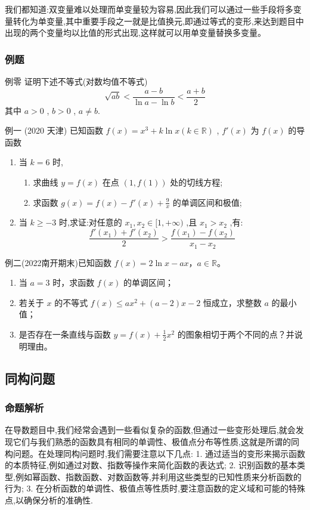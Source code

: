 \documentclass{article}
\begin{document}
我们都知道:双变量难以处理而单变量较为容易,因此我们可以通过一些手段将多变量转化为单变量,其中重要手段之一就是比值换元,即通过等式的变形,来达到题目中出现的两个变量均以比值的形式出现,这样就可以用单变量替换多变量。

\subsubsection{例题}

例零\; 证明下述不等式(对数均值不等式)
\[
\sqrt{a b}<\frac{a-b}{\ln a-\ln b}<\frac{a+b}{2}
\]
其中 $a>0$ , $b>0$ , $a \neq b$.
\vspace{10\baselineskip}


例一 (2020 天津) 已知函数 $f(x)=x^3+k \ln x(k \in \mathbb{R})$ , $f'(x)$ 为 $f(x)$ 的导函数
\begin{enumerate}
\item[(I)] 当 $k=6$ 时,
\begin{enumerate}
\item[(i)] 求曲线 $y=f(x)$ 在点 $(1, f(1))$ 处的切线方程;
\item[(ii)] 求函数 $g(x)=f(x)-f'(x)+\frac{9}{x}$ 的单调区间和极值;
\end{enumerate}
\item[(II)] 当 $k \geq-3$ 时,求证:对任意的 $x_1,x_2 \in[1,+\infty)$ ,且 $x_1>x_2$ ,有:
\[
\frac{f'\left(x_1\right)+f'\left(x_2\right)}{2}>\frac{f\left(x_1\right)-f\left(x_2\right)}{x_1-x_2}
\]
\end{enumerate}
\vspace{22\baselineskip}

例二(2022南开期末)已知函数 \(f(x) = 2\ln x - ax\)，\(a \in \mathbb{R}\)。

\begin{enumerate}
    \item[(1)] 当 \(a = 3\) 时，求函数 \(f(x)\) 的单调区间；
    \item[(2)] 若关于 \(x\) 的不等式 \(f(x) \leq ax^2 + (a-2)x - 2\) 恒成立，求整数 \(a\) 的最小值；
    \item[(3)] 是否存在一条直线与函数 \(y = f(x) + \frac{1}{2}x^2\) 的图象相切于两个不同的点？并说明理由。
\end{enumerate}
\vspace{25\baselineskip}
\newpage 

\subsection{同构问题}
\subsubsection{命题解析}
在导数题目中,我们经常会遇到一些看似复杂的函数,但通过一些变形处理后,就会发现它们与我们熟悉的函数具有相同的单调性、极值点分布等性质,这就是所谓的同构问题。在处理同构问题时,我们需要注意以下几点:
1. 通过适当的变形来揭示函数的本质特征,例如通过对数、指数等操作来简化函数的表达式;
2. 识别函数的基本类型,例如幂函数、指数函数、对数函数等,并利用这些类型的已知性质来分析函数的行为;
3. 在分析函数的单调性、极值点等性质时,要注意函数的定义域和可能的特殊点,以确保分析的准确性.
\end{document}
